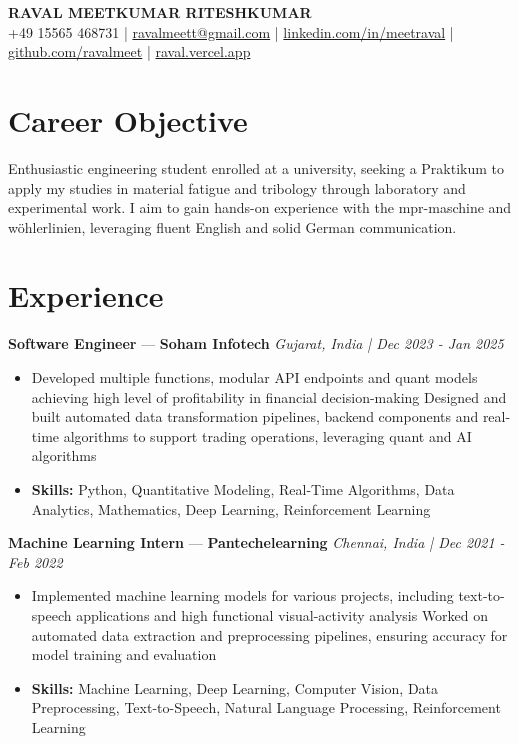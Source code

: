 \documentclass[a4paper,10pt]{article}
\begin{document}
\begin{center}
  {\Large\bfseries RAVAL MEETKUMAR RITESHKUMAR}\\[2pt]
  {\small +49 15565 468731 \;|\; \href{mailto:ravalmeett@gmail.com}{ravalmeett@gmail.com} \;|\; \href{https://www.linkedin.com/in/meetraval/}{linkedin.com/in/meetraval} \;|\; \href{https://github.com/ravalmeet}{github.com/ravalmeet} \;|\; \href{https://raval.vercel.app/}{raval.vercel.app}}
\end{center}
\vspace{-3pt}

\section*{Career Objective}
Enthusiastic engineering student enrolled at a university, seeking a Praktikum to apply my studies in material fatigue and tribology through laboratory and experimental work. I aim to gain hands-on experience with the mpr-maschine and wöhlerlinien, leveraging fluent English and solid German communication.\par

\section*{Experience}
\textbf{Software Engineer} — \textbf{Soham Infotech} \hfill \textit{Gujarat, India \;|\; Dec 2023 - Jan 2025}\par
\vspace{1pt}
\begin{itemize}
  \item Developed multiple functions, modular API endpoints and quant models achieving high level of profitability in financial decision-making Designed and built automated data transformation pipelines, backend components and real-time algorithms to support trading operations, leveraging quant and AI algorithms
  \item \textbf{Skills:} Python, Quantitative Modeling, Real-Time Algorithms, Data Analytics, Mathematics, Deep Learning, Reinforcement Learning
\end{itemize}
\vspace{3pt}
\textbf{Machine Learning Intern} — \textbf{Pantechelearning} \hfill \textit{Chennai, India \;|\; Dec 2021 - Feb 2022}\par
\vspace{1pt}
\begin{itemize}
  \item Implemented machine learning models for various projects, including text-to-speech applications and high functional visual-activity analysis Worked on automated data extraction and preprocessing pipelines, ensuring accuracy for model training and evaluation
  \item \textbf{Skills:} Machine Learning, Deep Learning, Computer Vision, Data Preprocessing, Text-to-Speech, Natural Language Processing, Reinforcement Learning
\end{itemize}
\end{document}
